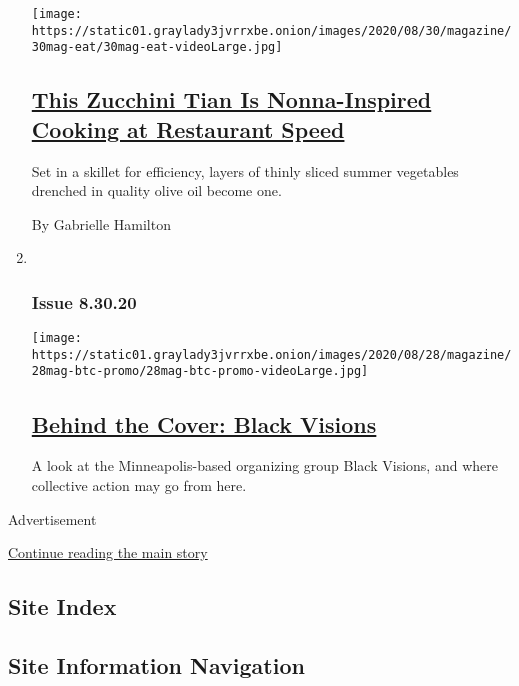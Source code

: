 \begin{enumerate}
  \texttt{[image: https://static01.graylady3jvrrxbe.onion/images/2020/08/30/magazine/30mag-eat/30mag-eat-videoLarge.jpg]}

  \hypertarget{this-zucchini-tian-is-nonna-inspired-cooking-at-restaurant-speed}{%
  \subsection{\texorpdfstring{\href{/2020/08/26/magazine/this-zucchini-tian-is-nonna-inspired-cooking-at-restaurant-speed.html}{This
  Zucchini Tian Is Nonna-Inspired Cooking at Restaurant
  Speed}}{This Zucchini Tian Is Nonna-Inspired Cooking at Restaurant Speed}}\label{this-zucchini-tian-is-nonna-inspired-cooking-at-restaurant-speed}}

  Set in a skillet for efficiency, layers of thinly sliced summer
  vegetables drenched in quality olive oil become one.

  By Gabrielle Hamilton
\item ~
  \hypertarget{issue-83020}{%
  \subsubsection{Issue 8.30.20}\label{issue-83020}}

  \texttt{[image: https://static01.graylady3jvrrxbe.onion/images/2020/08/28/magazine/28mag-btc-promo/28mag-btc-promo-videoLarge.jpg]}

  \hypertarget{behind-the-cover-black-visions}{%
  \subsection{\texorpdfstring{\href{/2020/08/28/magazine/behind-the-cover-black-visions.html}{Behind
  the Cover: Black
  Visions}}{Behind the Cover: Black Visions}}\label{behind-the-cover-black-visions}}

  A look at the Minneapolis-based organizing group Black Visions, and
  where collective action may go from here.
\end{enumerate}

Advertisement

\protect\hyperlink{after-mid1}{Continue reading the main story}

\hypertarget{site-index}{%
\subsection{Site Index}\label{site-index}}

\hypertarget{site-information-navigation}{%
\subsection{Site Information
Navigation}\label{site-information-navigation}}

